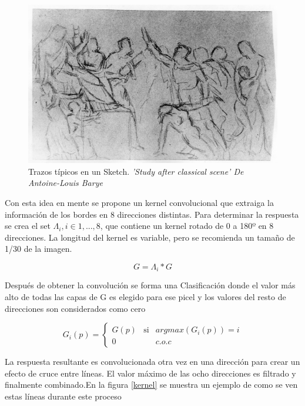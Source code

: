 \documentclass[letterpaper, 10 pt, conference]{ieeeconf}  %
\begin{document}
\begin{figure}[H]
\centering
\includegraphics[width=\linewidth, scale=0.1]{images/study_111.jpg}

\caption{Trazos típicos en un Sketch. \textit{'Study after classical scene' De Antoine-Louis Barye}}
    \label{sketch}
    \end{figure}

Con esta idea en mente se propone un kernel convolucional que extraiga la información de los bordes en 8 direcciones distintas. Para determinar la respuesta se crea el set ${\Lambda_{i}}, i\in {1, ..., 8}$, que contiene un kernel rotado de 0 a 180º en 8 direcciones. La longitud del kernel es variable, pero se recomienda un tamaño de 1/30 de la imagen.


\begin{equation} \label{}
G= \Lambda_{i} * G
\end{equation}

Después de obtener la convolución se forma una Clasificación donde el valor más alto de todas las capas de G es elegido para ese picel y los valores del resto de direcciones son considerados como cero


\begin{equation} \label{}
G_{i}(p)= \left\{ \begin{array}{rcl}
G(p)& \mbox{si}
& argmax(G_{i}(p))=i \\ 0 &  & c.o.c
\end{array}\right.
\end{equation}

La respuesta resultante es convolucionada otra vez en una dirección para crear un efecto de cruce entre líneas. El valor máximo de las ocho direcciones es filtrado y finalmente combinado.En la figura \ref{kernel} se muestra un ejemplo de como se ven estas líneas durante este proceso
\end{document}
